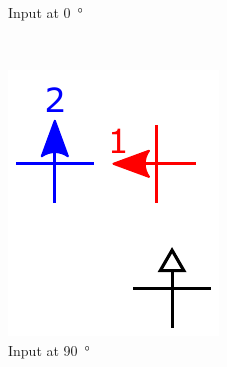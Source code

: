 \documentclass[11pt,a4paper,english,twoside]{article}
\newcommand{\rulesep}{\unskip\ \vrule\ }
\begin{document}
\begin{figure}[b!]
\begin{subfigure}[t]{0.2\textwidth}
    \caption{Input at \SI{0}{\degree}}
\end{subfigure}
\rulesep
\begin{subfigure}[t]{0.2\textwidth}
    \includegraphics[width=\textwidth]{Figures/half_adder/schematic/000006_inputs_In1_0213/Input 90 deg arrowtext.pdf}
    \caption{Input at \SI{90}{\degree}}
\end{subfigure}
\rulesep
\begin{subfigure}[t]{0.2\textwidth}

\end{subfigure}
\end{figure}
\end{document}
